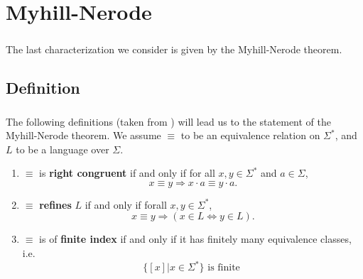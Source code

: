 
\chapter{Myhill-Nerode}

\paragraph{}

The last characterization we consider is given by the Myhill-Nerode theorem.

\section{Definition}

\paragraph{}

The following definitions (taken from \cite{DBLP:books/daglib/0088160}) will lead us to the statement of the Myhill-Nerode theorem.
We assume $\equiv$ to be an equivalence relation on $\Sigma^*$, and $L$ to be a language over $\Sigma$.

\begin{enumerate}[label=(\roman*)]

    \item\label{rightcongruent}
        $\equiv$ is \textbf{right congruent} if and only if for all $x, y \in \Sigma^*$ and $a \in \Sigma$,
        \begin{equation*}
            x \equiv y \Rightarrow
            x \cdot a \equiv y \cdot a.
        \end{equation*}


    \item\label{refinement}
        $\equiv$ \textbf{refines} $L$ if and only if forall $x,y \in \Sigma^*$,
        \begin{equation*}
            x \equiv y \Rightarrow
            (x \in L \Leftrightarrow y \in L).
        \end{equation*}

    \item\label{finiteindex}
        $\equiv$ is of \textbf{finite index} if and only if it has finitely many equivalence classes, i.e.
        \begin{equation*}
            \{[x] | x \in \Sigma^*\} \mbox{ is finite }
        \end{equation*}

\end{enumerate}

